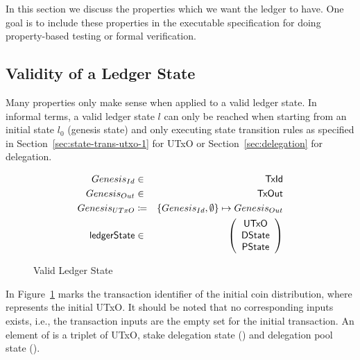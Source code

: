 In this section we discuss the properties which we want the ledger to have. One
goal is to include these properties in the executable specification for doing
property-based testing or formal verification.

\subsection{Validity of a Ledger State}
\label{sec:valid-ledg-state}

Many properties only make sense when applied to a valid ledger state. In
informal terms, a valid ledger state $l$ can only be reached when starting from
an initial state $l_{0}$ (genesis state) and only executing state transition
rules as specified in Section~\ref{sec:state-trans-utxo-1} for UTxO or
Section~\ref{sec:delegation} for delegation.

\begin{figure}[ht]
  \centering
  \begin{align*}
    Genesis_{Id} & \in & \mathsf{TxId} \\
    Genesis_{Out} & \in & \mathsf{TxOut} \\
    Genesis_{UTxO} & \coloneqq & \{Genesis_{Id}, \emptyset\} \mapsto Genesis_{Out}
    \\
    \mathsf{ledgerState} & \in & \left(
                         \begin{array}{c}
                           \mathsf{UTxO} \\
                           \mathsf{DState} \\
                           \mathsf{PState}
                         \end{array}
                         \right)
  \end{align*}
  \caption{Valid Ledger State}
  \label{fig:valid-ledger}
\end{figure}

In Figure~\ref{fig:valid-ledger} \genesisId{} marks the transaction identifier
of the initial coin distribution, where \genesisTxOut{} represents the initial
UTxO. It should be noted that no corresponding inputs exists, i.e., the
transaction inputs are the empty set for the initial transaction. An element of
\ledgerState{} is a triplet of UTxO, stake delegation state (\DState) and
delegation pool state (\PState).

